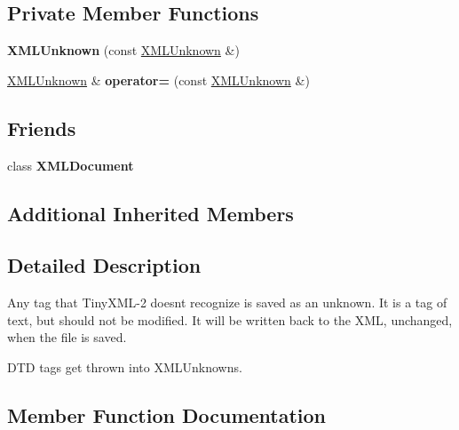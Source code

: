 \subsection*{Private Member Functions}
\begin{DoxyCompactItemize}
\item 
\hypertarget{classtinyxml2_1_1_x_m_l_unknown_aab31a93c95a7cedc9597cea7caffa73f}{}{\bfseries X\+M\+L\+Unknown} (const \hyperlink{classtinyxml2_1_1_x_m_l_unknown}{X\+M\+L\+Unknown} \&)\label{classtinyxml2_1_1_x_m_l_unknown_aab31a93c95a7cedc9597cea7caffa73f}

\item 
\hypertarget{classtinyxml2_1_1_x_m_l_unknown_a6137d5611db42c35de3d869f66555e5b}{}\hyperlink{classtinyxml2_1_1_x_m_l_unknown}{X\+M\+L\+Unknown} \& {\bfseries operator=} (const \hyperlink{classtinyxml2_1_1_x_m_l_unknown}{X\+M\+L\+Unknown} \&)\label{classtinyxml2_1_1_x_m_l_unknown_a6137d5611db42c35de3d869f66555e5b}

\end{DoxyCompactItemize}
\subsection*{Friends}
\begin{DoxyCompactItemize}
\item 
\hypertarget{classtinyxml2_1_1_x_m_l_unknown_a4eee3bda60c60a30e4e8cd4ea91c4c6e}{}class {\bfseries X\+M\+L\+Document}\label{classtinyxml2_1_1_x_m_l_unknown_a4eee3bda60c60a30e4e8cd4ea91c4c6e}

\end{DoxyCompactItemize}
\subsection*{Additional Inherited Members}


\subsection{Detailed Description}
Any tag that Tiny\+X\+M\+L-\/2 doesn\textquotesingle{}t recognize is saved as an unknown. It is a tag of text, but should not be modified. It will be written back to the X\+M\+L, unchanged, when the file is saved.

D\+T\+D tags get thrown into X\+M\+L\+Unknowns. 

\subsection{Member Function Documentation}
\hypertarget{classtinyxml2_1_1_x_m_l_unknown_ac691f4efd84cad997b93c158e391e461}{}
